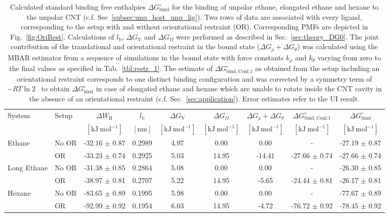 \documentclass[9pt,lessons,pubversion]{livecoms}
\begin{document}
\begin{table}[ht]
\caption{\label{tbl:unpLigOR} 
Calculated standard binding free enthalpies $\Delta G^\circ_\mathrm{bind}$ for the binding of unpolar ethane, elongated ethane and hexane to the unpolar CNT (c.f. Sec~\ref{subsec:unp_host_unp_lig}).
Two rows of data are associated with every ligand, corresponding to the setup with and without orientational restraint (OR).
Corresponding PMFs are depicted in Fig.~\ref{fig:OriRest}. 
Calculations of $l_\mathrm{b}$,  $\Delta G_\mathrm{V}$ and $\Delta G_\Omega$ were performed as described in Sec.~\ref{sec:theory_DG0}. 
The joint contribution of the translational and orientational restraint in the bound state ($\Delta G_\rho + \Delta G_\theta$) was calculated using the MBAR estimator from a sequence of simulations in the bound state with force constants $k_\rho$ and $k_\theta$ varying from zero to the final values as specified in Tab.~\ref{tbl:restr_1}. 
The estimate of $\Delta G^\circ_\mathrm{bind, Conf. 1}$ as obtained from the setup including an orientational restraint corresponds to one distinct binding configuration and was corrected 
by a symmetry term of $-RT \ln 2$~\cite{gilson2013correction, hermans1997inclusion} to obtain $\Delta G^\circ_\mathrm{bind}$ in case of elongated ethane and hexane 
which are unable to rotate inside the CNT cavity in the absence of an orientational restraint (c.f. Sec.~\ref{sec:application}). 
Error estimates refer to the UI result.
}
\centering
\begin{tabular}{llc ccc ccc}\hline
System & Setup & $\Delta W_\mathrm{R}$  & $l_\mathrm{b}$ & $\Delta G_\mathrm{V}$ & $\Delta G_\Omega$ & 
$\Delta G_\rho + \Delta G_\theta$ & $\Delta G^\circ_\mathrm{bind, Conf. 1}$ & $\Delta G^\circ_\mathrm{bind}$ \\
& & $[\mathrm{kJ~mol}^{-1}]$ & $[\mathrm{nm}]$ &  $[\mathrm{kJ~mol}^{-1}]$ & $[\mathrm{kJ~mol}^{-1}]$ & $[\mathrm{kJ~mol}^{-1}]$ & $[\mathrm{kJ~mol}^{-1}]$ & $[\mathrm{kJ~mol}^{-1}]$ \\ 
\hline
\multirow{ 2}{*}{Ethane}  		& No OR 	& -32.16 $\pm$ 0.87 	& 0.2989 	&  4.97 	&  0.00 	&  0.00 	&  -  					& -27.19 $\pm$ 0.87 \\   
						& OR       	& -33.23 $\pm$ 0.74 	& 0.2925  	&  5.03 	&  14.95	&  -14.41 	&  -27.66 $\pm$ 0.74  	& -27.66 $\pm$ 0.74 \\ 
\hline
\multirow{ 2}{*}{Long Ethane}  	& No OR 	& -31.38 $\pm$ 0.85 	& 0.2864 	&  5.08 	&  0.00 	&  0.00 	&  -  					& -26.30 $\pm$ 0.85 \\    
					      	& OR       	& -38.97 $\pm$ 0.81 	& 0.2707  	&  5.22 	&  14.95 	&  -5.65 	&  -24.44 $\pm$ 0.81  	& -26.17 $\pm$ 0.81\\ 
\hline
\multirow{ 2}{*}{Hexane}  		& No OR 	& -83.65 $\pm$ 0.89 & 0.1995 	&  5.98 	&  0.00 	&  0.00 	&  -  					& -77.67 $\pm$ 0.89\\  
						& OR       	& -92.99 $\pm$ 0.92 & 0.1954  &  6.03 	&  14.95 	&  -4.72 	&  -76.72 $\pm$ 0.92  	& -78.45 $\pm$ 0.92\\   
\hline
\end{tabular}
\end{table}
\end{document}
